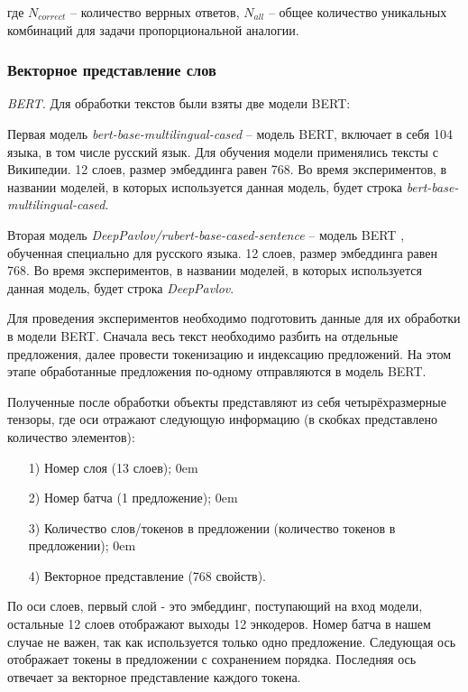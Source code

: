 \documentclass[a4paper,14pt]{article}
\begin{document}
где $N_{correct}$ -- количество веррных ответов, $N_{all}$ -- общее количество уникальных комбинаций для задачи пропорциональной аналогии.

\subsubsection{Векторное представление слов}

\textit{BERT.}
Для обработки текстов были взяты две модели BERT:

Первая модель \textit{bert-base-multilingual-cased} -- модель BERT, включает в себя 104 языка, в том числе русский язык.
Для обучения модели применялись тексты с Википедии.
12 слоев, размер эмбеддинга равен 768.
Во время экспериментов, в названии моделей, в которых используется данная модель, будет строка \textit{bert-base-multilingual-cased}.

Вторая модель \textit{DeepPavlov/rubert-base-cased-sentence} -- модель BERT \cite{deep}, обученная специально для русского языка.
12 слоев, размер эмбеддинга равен 768.
Во время экспериментов, в названии моделей, в которых используется данная модель, будет строка \textit{DeepPavlov}.

Для проведения экспериментов необходимо подготовить данные для их обработки в модели BERT.
Сначала весь текст необходимо разбить на отдельные предложения, далее провести токенизацию и индексацию предложений.
На этом этапе обработанные предложения по-одному отправляются в модель BERT.

Полученные после обработки объекты представляют из себя четырёхразмерные тензоры, где оси отражают следующую информацию (в скобках представлено количество элементов):

\begin{enumerate}
		\itemsep0em 
	\item[1)] Номер слоя (13 слоев);
		\itemsep0em 
	\item[2)] Номер батча (1 предложение);
		\itemsep0em 
	\item[3)] Количество слов/токенов в предложении (количество токенов в предложении);
		\itemsep0em 
	\item[4)] Векторное представление (768 свойств).
	
\end{enumerate}	

По оси слоев, первый слой - это эмбеддинг, поступающий на вход модели, остальные 12 слоев отображают выходы 12 энкодеров.
Номер батча в нашем случае не важен, так как используется только одно предложение.
Следующая ось отображает токены в предложении с сохранением порядка.
Последняя ось отвечает за векторное представление каждого токена.
\end{document}
